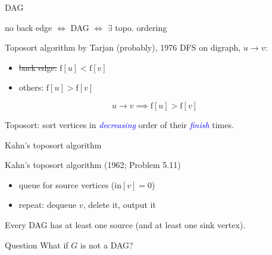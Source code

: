 
\begin{frame}{DAG}
  \begin{center}
    no back edge $\iff$ DAG \pause $\iff$ $\exists$ topo. ordering
  \end{center}

  \begin{block}{Toposort algorithm by Tarjan (probably), 1976}
    DFS on digraph, $u \to v$:
    \begin{itemize}
	  \item \sout{back edge:} $\text{f}[u] < \text{f}[v]$
      \item others: $\text{f}[u] > \text{f}[v]$
    \end{itemize}

	\pause
    \[ 
	  u \to v \implies \text{f}[u] > \text{f}[v]
	\]

	\pause
    \begin{center}
	  Toposort: sort vertices in \textcolor{blue}{\emph{decreasing}} order of their \textcolor{blue}{\emph{finish}} times.
    \end{center}
  \end{block}
\end{frame}
\begin{frame}{Kahn's toposort algorithm}
  \begin{exampleblock}{Kahn's toposort algorithm (1962; Problem 5.11) }
    \begin{itemize}
      \item queue for source vertices ($\text{in}[v] = 0$)
      \item repeat: dequeue $v$, delete it, output it
    \end{itemize}
  \end{exampleblock}

  \pause
  \begin{lemma}
	Every DAG has at least one source (and at least one sink vertex).
  \end{lemma}

  \pause
  \begin{alertblock}{Question}
	What if $G$ is not a DAG?
  \end{alertblock}
\end{frame}

